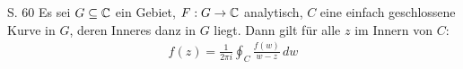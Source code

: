 \begin{satz}{S. 60}
  \label{satz:cauchy_integralformel}
  Es sei $G \subseteq \mathbb{C}$ ein Gebiet, $F: G \to \mathbb{C}$ analytisch, $C$ eine einfach geschlossene Kurve in $G$, deren Inneres danz in $G$ liegt.
  Dann gilt für alle $z$ im Innern von $C$:
  \begin{align}
    f(z) = \frac{1}{2 \pi i} \oint_C \frac{f(w)}{w-z} \, dw
  \end{align}
\end{satz}
